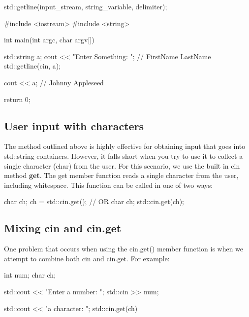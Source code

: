 \documentclass{report}
\begin{document}
    \begin{cppcode}
                    std::getline(input_stream, string_variable, delimiter);
    \end{cppcode}
    \bigbreak \noindent 
    
    \bigbreak \noindent 
    
    \begin{cppcode}
#include <iostream>
#include <string>

int main(int argc, char argv[]){

    std::string a;
    cout << "Enter Something: "; // FirstName LastName
    std::getline(cin, a);

    cout << a; // Johnny Appleseed

    return 0;
}
    \end{cppcode}
    

    \pagebreak \bigbreak \noindent 
    \subsection{User input with characters}
    \bigbreak \noindent 
    The method outlined above is highly effective for obtaining input that goes into std::string containers. However, it falls short when you try to use it to collect a single character (char) from the user. 
    \bigbreak \noindent 
    For this scenario, we use the built in cin method \textbf{get}. The get member function reads a single character from the user, including whitespace. 
    \bigbreak \noindent 
    This function can be called in one of two ways:
    \smallbreak \noindent
    
    \begin{cppcode}
char ch;
ch = std::cin.get();
// OR 
char ch;
std::cin.get(ch);
    \end{cppcode}
    

    \bigbreak \noindent 
    \subsection{Mixing cin and cin.get}
    \bigbreak \noindent 
    One problem that occurs when using the cin.get() member function is when we attempt to combine both cin and cin.get. For example:
    \smallbreak \noindent
    
    \begin{cppcode}
int num;
char ch;

std::cout << "Enter a number: ";
std::cin >> num;

std::cout << "\nEnter a character: ";
std::cin.get(ch)
    \end{cppcode}
    
\end{document}
